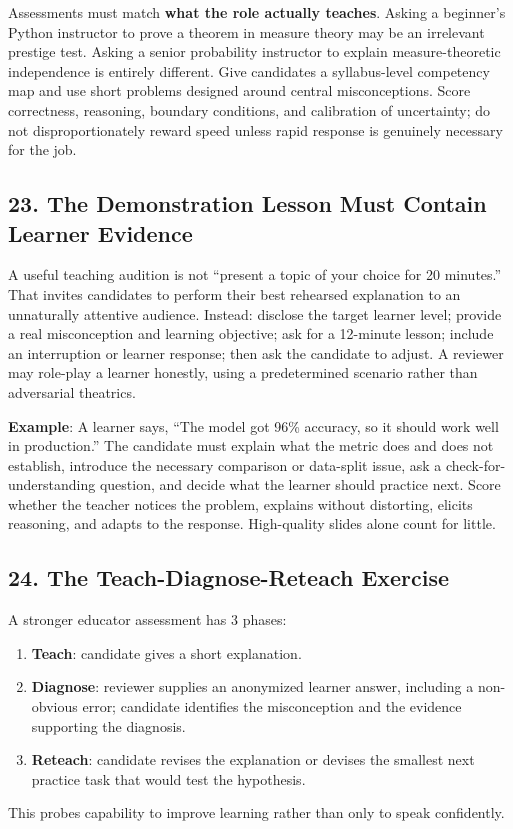 Assessments must match \textbf{what the role actually teaches}. Asking a beginner's Python instructor to prove a theorem in measure theory may be an irrelevant prestige test. Asking a senior probability instructor to explain measure-theoretic independence is entirely different. Give candidates a syllabus-level competency map and use short problems designed around central misconceptions. Score correctness, reasoning, boundary conditions, and calibration of uncertainty; do not disproportionately reward speed unless rapid response is genuinely necessary for the job.

\subsection*{23. The Demonstration Lesson Must Contain Learner Evidence}

A useful teaching audition is not ``present a topic of your choice for 20 minutes.'' That invites candidates to perform their best rehearsed explanation to an unnaturally attentive audience. Instead: disclose the target learner level; provide a real misconception and learning objective; ask for a 12-minute lesson; include an interruption or learner response; then ask the candidate to adjust. A reviewer may role-play a learner honestly, using a predetermined scenario rather than adversarial theatrics.

\textbf{Example}: A learner says, ``The model got 96\% accuracy, so it should work well in production.'' The candidate must explain what the metric does and does not establish, introduce the necessary comparison or data-split issue, ask a check-for-understanding question, and decide what the learner should practice next. Score whether the teacher notices the problem, explains without distorting, elicits reasoning, and adapts to the response. High-quality slides alone count for little.

\subsection*{24. The Teach-Diagnose-Reteach Exercise}

A stronger educator assessment has 3 phases:
\begin{enumerate}[leftmargin=*]
\item \textbf{Teach}: candidate gives a short explanation.
\item \textbf{Diagnose}: reviewer supplies an anonymized learner answer, including a non-obvious error; candidate identifies the misconception and the evidence supporting the diagnosis.
\item \textbf{Reteach}: candidate revises the explanation or devises the smallest next practice task that would test the hypothesis.
\end{enumerate}
This probes capability to improve learning rather than only to speak confidently.

